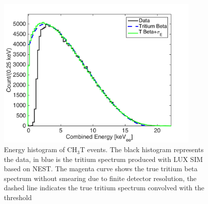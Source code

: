 \begin{figure}[h!]\centering
\includegraphics[width=100mm]{fig/tritium-spectrum-linear.png}
\caption{ Energy histogram of CH$_3$T events. The black histogram represents the data, in blue is the tritium spectrum produced with LUX SIM based on NEST. The magenta curve shows the true tritium beta spectrum without smearing due to finite detector resolution, the dashed line indicates the true tritium spectrum convolved with the threshold}
\label{fig:Spectrum}
\end{figure}

